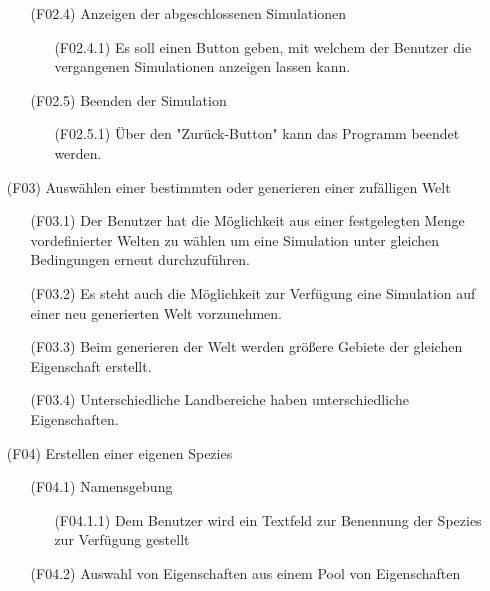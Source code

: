 \documentclass[a4paper, 10pt]{article}
\begin{document}
\begin{enumerate}
\begin{enumerate}
\item[(F02.4)]Anzeigen der abgeschlossenen Simulationen
\begin{enumerate}
\item [(F02.4.1)]Es soll einen Button geben, mit welchem der Benutzer die vergangenen Simulationen anzeigen lassen kann.
\end{enumerate}

\item[(F02.5)]Beenden der Simulation
\begin{enumerate}
\item [(F02.5.1)]Über den "Zurück-Button" kann das Programm beendet werden.
\end{enumerate}
\end{enumerate}

\item[(F03)]Auswählen einer bestimmten oder generieren einer zufälligen Welt
\begin{enumerate}
\item[(F03.1)]Der Benutzer hat die Möglichkeit aus einer festgelegten Menge vordefinierter Welten zu wählen um eine Simulation unter gleichen Bedingungen erneut durchzuführen.
\item[(F03.2)]
Es steht auch die Möglichkeit zur Verfügung eine Simulation auf einer neu generierten Welt vorzunehmen.
\item[(F03.3)]
Beim generieren der Welt werden größere Gebiete der gleichen Eigenschaft erstellt. 
\item[(F03.4)]
Unterschiedliche Landbereiche haben unterschiedliche Eigenschaften.
\end{enumerate}

\item[(F04)]
Erstellen einer eigenen Spezies

\begin{enumerate}
\item[(F04.1)]Namensgebung
\begin{enumerate}
\item[(F04.1.1)]Dem Benutzer wird ein Textfeld zur Benennung der Spezies zur Verfügung gestellt
\end{enumerate}

\item[(F04.2)] Auswahl von Eigenschaften aus einem Pool von Eigenschaften


\end{enumerate}
\end{enumerate}
\end{document}
